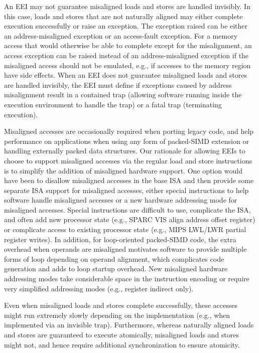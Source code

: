 An EEI may not guarantee misaligned loads and stores are handled
invisibly.  In this case, loads and stores that are not naturally
aligned may either complete execution successfully or raise an
exception.  The exception raised can be either an address-misaligned
exception or an access-fault exception.  For a memory access that would
otherwise be able to complete except for the misalignment, an access
exception can be raised instead of an address-misaligned exception if
the misaligned access should not be emulated, e.g., if accesses to the
memory region have side effects.  When an EEI does not guarantee
misaligned loads and stores are handled invisibly, the EEI must define
if exceptions caused by address misalignment result in a contained
trap (allowing software running inside the execution environment to
handle the trap) or a fatal trap (terminating execution).

\begin{commentary}
Misaligned accesses are occasionally required when porting legacy
code, and help performance on applications when using any form of
packed-SIMD extension or handling externally packed data structures.
Our rationale for allowing EEIs to choose to support misaligned
accesses via the regular load and store instructions is to simplify
the addition of misaligned hardware support.  One option would have
been to disallow misaligned accesses in the base ISA and then provide
some separate ISA support for misaligned accesses, either special
instructions to help software handle misaligned accesses or a new
hardware addressing mode for misaligned accesses.  Special
instructions are difficult to use, complicate the ISA, and often add
new processor state (e.g., SPARC VIS align address offset register) or
complicate access to existing processor state (e.g., MIPS LWL/LWR
partial register writes).  In addition, for loop-oriented packed-SIMD
code, the extra overhead when operands are misaligned motivates
software to provide multiple forms of loop depending on operand
alignment, which complicates code generation and adds to loop startup
overhead.  New misaligned hardware addressing modes take considerable
space in the instruction encoding or require very simplified
addressing modes (e.g., register indirect only).
\end{commentary}

Even when misaligned loads and stores complete successfully, these
accesses might run extremely slowly depending on the implementation
(e.g., when implemented via an invisible trap).  Furthermore, whereas
naturally aligned loads and stores are guaranteed to execute
atomically, misaligned loads and stores might not, and hence
require additional synchronization to ensure atomicity.

